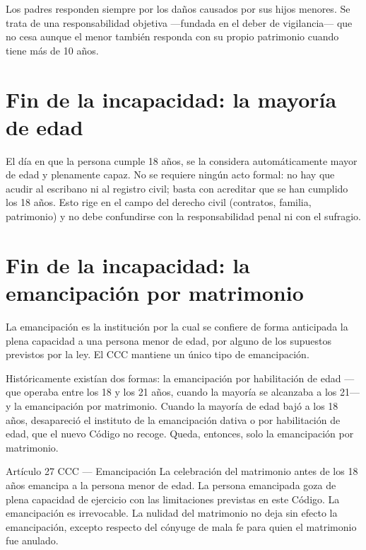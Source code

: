 \documentclass[12pt,oneside]{book}
\begin{document}
Los padres responden siempre por los daños causados por sus hijos menores. Se trata de una responsabilidad objetiva —fundada en el deber de vigilancia— que no cesa aunque el menor también responda con su propio patrimonio cuando tiene más de 10 años.

\section{Fin de la incapacidad: la mayoría de edad}

\begin{important}
El día en que la persona cumple 18 años, se la considera automáticamente mayor de edad y plenamente capaz. No se requiere ningún acto formal: no hay que acudir al escribano ni al registro civil; basta con acreditar que se han cumplido los 18 años. Esto rige en el campo del derecho civil (contratos, familia, patrimonio) y no debe confundirse con la responsabilidad penal ni con el sufragio.
\end{important}

\section{Fin de la incapacidad: la emancipación por matrimonio}

La emancipación es la institución por la cual se confiere de forma anticipada la plena capacidad a una persona menor de edad, por alguno de los supuestos previstos por la ley. El CCC mantiene un único tipo de emancipación.

Históricamente existían dos formas: la emancipación por habilitación de edad —que operaba entre los 18 y los 21 años, cuando la mayoría se alcanzaba a los 21— y la emancipación por matrimonio. Cuando la mayoría de edad bajó a los 18 años, desapareció el instituto de la emancipación dativa o por habilitación de edad, que el nuevo Código no recoge. Queda, entonces, solo la emancipación por matrimonio.

\begin{definition}{Artículo 27 CCC — Emancipación}
La celebración del matrimonio antes de los 18 años emancipa a la persona menor de edad. La persona emancipada goza de plena capacidad de ejercicio con las limitaciones previstas en este Código. La emancipación es irrevocable. La nulidad del matrimonio no deja sin efecto la emancipación, excepto respecto del cónyuge de mala fe para quien el matrimonio fue anulado.
\end{definition}
\end{document}
